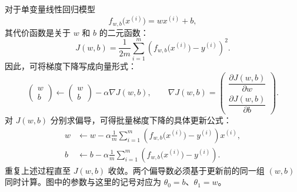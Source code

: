 \documentclass[12pt,a4paper]{ctexart}
\begin{document}
\begin{examplebox}[线性回归的梯度下降]
  对于单变量线性回归模型
  \[
    f_{w,b}\bigl(x^{(i)}\bigr)=wx^{(i)}+b,
  \]
  其代价函数是关于 $w$ 和 $b$ 的二元函数：
  \[
    J(w,b)=\frac{1}{2m}\sum_{i=1}^{m}
    \left(f_{w,b}\bigl(x^{(i)}\bigr)-y^{(i)}\right)^2.
  \]
  因此，可将梯度下降写成向量形式：
  \[
    \begin{pmatrix} w \\ b \end{pmatrix}
    \leftarrow
    \begin{pmatrix} w \\ b \end{pmatrix}
    -\alpha\nabla J(w,b),
    \qquad
    \nabla J(w,b)=
    \begin{pmatrix}
      \dfrac{\partial J(w,b)}{\partial w} \\[6pt]
      \dfrac{\partial J(w,b)}{\partial b}
    \end{pmatrix}.
  \]
  对 $J(w,b)$ 分别求偏导，可得批量梯度下降的具体更新公式：
  \begin{align*}
    w &\leftarrow w-\alpha\frac{1}{m}\sum_{i=1}^{m}
    \left(f_{w,b}\bigl(x^{(i)}\bigr)-y^{(i)}\right)x^{(i)}, \\
    b &\leftarrow b-\alpha\frac{1}{m}\sum_{i=1}^{m}
    \left(f_{w,b}\bigl(x^{(i)}\bigr)-y^{(i)}\right).
  \end{align*}
  重复上述过程直至 $J(w,b)$ 收敛。两个偏导数必须基于更新前的同一组
  $(w,b)$ 同时计算。图中的参数与这里的记号对应为
  $\theta_0=b$、$\theta_1=w$。
\end{examplebox}
\end{document}
